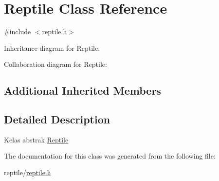 \hypertarget{classReptile}{}\section{Reptile Class Reference}
\label{classReptile}


{\ttfamily \#include $<$reptile.\+h$>$}



Inheritance diagram for Reptile\+:


Collaboration diagram for Reptile\+:
\subsection*{Additional Inherited Members}


\subsection{Detailed Description}
Kelas abstrak \hyperlink{classReptile}{Reptile} 

The documentation for this class was generated from the following file\+:\begin{DoxyCompactItemize}
\item 
reptile/\hyperlink{reptile_8h}{reptile.\+h}\end{DoxyCompactItemize}
